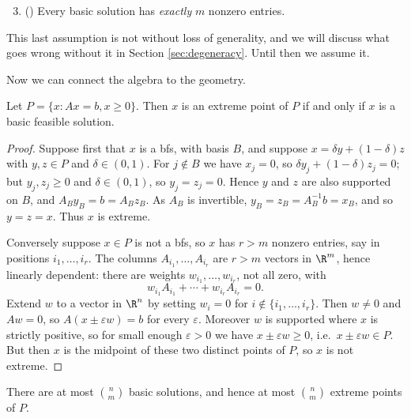 \begin{enumerate}[label=(\Alph*)]
    \setcounter{enumi}{2}
    \item () Every basic solution has \emph{exactly} $m$ nonzero entries.
\end{enumerate}
This last assumption is not without loss of generality, and we will discuss what goes wrong without it in Section \ref{sec:degeneracy}. Until then we assume it.

Now we can connect the algebra to the geometry.

\begin{theorem}
    Let $P = \{x : Ax = b, x \geq 0\}$. Then $x$ is an extreme point of $P$ if and only if $x$ is a basic feasible solution.
\end{theorem}
\begin{proof}
    Suppose first that $x$ is a bfs, with basis $B$, and suppose $x = \delta y + (1 - \delta)z$ with $y, z \in P$ and $\delta \in (0,1)$. For $j \notin B$ we have $x_j = 0$, so $\delta y_j + (1-\delta)z_j = 0$; but $y_j, z_j \geq 0$ and $\delta \in (0,1)$, so $y_j = z_j = 0$. Hence $y$ and $z$ are also supported on $B$, and $A_B y_B = b = A_B z_B$. As $A_B$ is invertible, $y_B = z_B = A_B^{-1}b = x_B$, and so $y = z = x$. Thus $x$ is extreme.

    Conversely suppose $x \in P$ is not a bfs, so $x$ has $r > m$ nonzero entries, say in positions $i_1, \dots, i_r$. The columns $A_{i_1}, \dots, A_{i_r}$ are $r > m$ vectors in $\R^m$, hence linearly dependent: there are weights $w_{i_1}, \dots, w_{i_r}$, not all zero, with
    $$
    w_{i_1}A_{i_1} + \cdots + w_{i_r}A_{i_r} = 0.
    $$
    Extend $w$ to a vector in $\R^n$ by setting $w_i = 0$ for $i \notin \{i_1, \dots, i_r\}$. Then $w \neq 0$ and $Aw = 0$, so $A(x \pm \varepsilon w) = b$ for every $\varepsilon$. Moreover $w$ is supported where $x$ is strictly positive, so for small enough $\varepsilon > 0$ we have $x \pm \varepsilon w \geq 0$, i.e.\ $x \pm \varepsilon w \in P$. But then $x$ is the midpoint of these two distinct points of $P$, so $x$ is not extreme.
\end{proof}

\begin{corollary}
    There are at most $\binom{n}{m}$ basic solutions, and hence at most $\binom{n}{m}$ extreme points of $P$.
\end{corollary}

